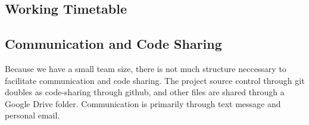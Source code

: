 \documentclass[11pt]{article} %
\begin{document}
\subsection{Working Timetable}

\subsection{Communication and Code Sharing}
Because we have a small team size, there is not much structure neccessary to facilitate communication and code sharing. The project source control through git doubles as 
code-sharing through github, and other files are shared through a Google Drive folder. Communication is primarily through text message and personal email.
\end{document}
